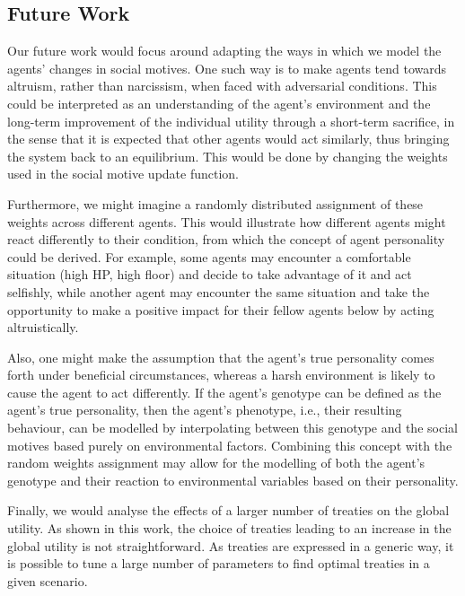 \subsection{Future Work}
Our future work would focus around adapting the ways in which we model the agents' changes in social motives. One such way is to make agents tend towards altruism, rather than narcissism, when faced with adversarial conditions. This could be interpreted as an understanding of the agent's environment and the long-term improvement of the individual utility through a short-term sacrifice, in the sense that it is expected that other agents would act similarly, thus bringing the system back to an equilibrium. This would be done by changing the weights used in the social motive update function.

Furthermore, we might imagine a randomly distributed assignment of these weights across different agents. This would illustrate how different agents might react differently to their condition, from which the concept of agent personality could be derived. For example, some agents may encounter a comfortable situation (high HP, high floor) and decide to take advantage of it and act selfishly, while another agent may encounter the same situation and take the opportunity to make a positive impact for their fellow agents below by acting altruistically.

Also, one might make the assumption that the agent's true personality comes forth under beneficial circumstances, whereas a harsh environment is likely to cause the agent to act differently. If the agent's genotype can be defined as the agent's true personality, then the agent's phenotype, i.e., their resulting behaviour, can be modelled by interpolating between this genotype and the social motives based purely on environmental factors. Combining this concept with the random weights assignment may allow for the modelling of both the agent's genotype and their reaction to environmental variables based on their personality.

Finally, we would analyse the effects of a larger number of treaties on the global utility. As shown in this work, the choice of treaties leading to an increase in the global utility is not straightforward. As treaties are expressed in a generic way, it is possible to tune a large number of parameters to find optimal treaties in a given scenario.



